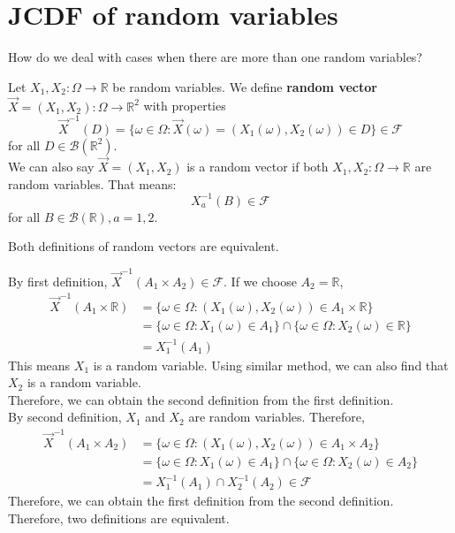 \documentclass{huhtakm-template-book}
\begin{document}
\section{JCDF of random variables}
    How do we deal with cases when there are more than one random variables?
    \begin{defn}
        Let $X_{1},X_{2}:\Omega\to\mathbb{R}$ be random variables. We define \textbf{random vector} $\vec{X}=(X_{1},X_{2}):\Omega\to\mathbb{R}^{2}$ with properties
        \begin{equation*}
            \vec{X}^{-1}(D)=\{\omega\in\Omega:\vec{X}(\omega)=(X_{1}(\omega),X_{2}(\omega))\in D\}\in\mathcal{F}
        \end{equation*}
        for all $D\in\mathcal{B}(\mathbb{R}^{2})$.\\
        We can also say $\vec{X}=(X_{1},X_{2})$ is a random vector if both $X_{1},X_{2}:\Omega\to\mathbb{R}$ are random variables. That means:
        \begin{equation*}
            X_{a}^{-1}(B)\in\mathcal{F}
        \end{equation*}
        for all $B\in\mathcal{B}(\mathbb{R}),a=1,2$.
    \end{defn}
    \begin{cla}
        Both definitions of random vectors are equivalent.
    \end{cla}
    \begin{proofing}
        By first definition, $\vec{X}^{-1}(A_{1}\times A_{2})\in\mathcal{F}$. If we choose $A_{2}=\mathbb{R}$,
        \begin{align*}
            \vec{X}^{-1}(A_{1}\times \mathbb{R})&=\{\omega\in\Omega:(X_{1}(\omega),X_{2}(\omega))\in A_{1}\times\mathbb{R}\}\\
            &=\{\omega\in\Omega:X_{1}(\omega)\in A_{1}\}\cap\{\omega\in\Omega:X_{2}(\omega)\in\mathbb{R}\}\\
            &=X_{1}^{-1}(A_{1})
        \end{align*}
        This means $X_{1}$ is a random variable. Using similar method, we can also find that $X_{2}$ is a random variable.\\
        Therefore, we can obtain the second definition from the first definition.\\
        By second definition, $X_{1}$ and $X_{2}$ are random variables. Therefore,
        \begin{align*}
            \vec{X}^{-1}(A_{1}\times A_{2})&=\{\omega\in\Omega:(X_{1}(\omega),X_{2}(\omega))\in A_{1}\times A_{2}\}\\
            &=\{\omega\in\Omega:X_{1}(\omega)\in A_{1}\}\cap\{\omega\in\Omega:X_{2}(\omega)\in A_{2}\}\\
            &=X_{1}^{-1}(A_{1})\cap X_{2}^{-1}(A_{2})\in\mathcal{F}
        \end{align*}
        Therefore, we can obtain the first definition from the second definition.\\
        Therefore, two definitions are equivalent.
    \end{proofing}
\end{document}
